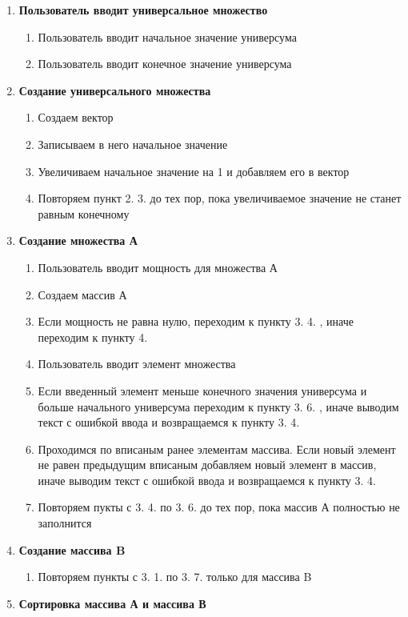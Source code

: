 \documentclass[]{article}
\begin{document}
	\begin{enumerate}[1.]
		\item \textbf{Пользователь вводит универсальное множество} \begin{enumerate}[{1}. 1.]
			 \item Пользователь вводит начальное значение универсума
			 \item Пользователь вводит конечное значение универсума
		\end{enumerate}
		\item \textbf{Создание универсального множества}
		\begin{enumerate}[{2}. 1.] 
		\item Создаем вектор
		\item Записываем в него начальное значение
		\item Увеличиваем начальное значение на 1 и добавляем его в вектор
		\item Повторяем пункт 2. 3. до тех пор, пока увеличиваемое значение не станет равным конечному
		\end{enumerate}
		\item \textbf{Создание множества А}
		\begin{enumerate}[{3}. 1.] 
		\item Пользователь вводит мощность для множества А
		\item Создаем массив А
		\item Если мощность не равна нулю, переходим к пункту 3. 4. , иначе переходим к пункту 4.
		\item Пользователь вводит элемент множества
		\item Если введенный элемент меньше конечного значения универсума и больше начального универсума переходим к пункту 3. 6. , иначе выводим текст с ошибкой ввода и возвращаемся к пункту 3. 4.
		\item Проходимся по вписаным ранее элементам массива. Если новый элемент не равен предыдущим вписаным добавляем новый элемент в массив, иначе выводим текст с ошибкой ввода и возвращаемся к пункту 3. 4.
		\item Повторяем пукты с 3. 4. по 3. 6. до тех пор, пока массив А полностью не заполнится
		\end{enumerate}
		\item \textbf{Создание массива B}
		\begin{enumerate}[{4}. 1.]
		\item Повторяем пункты с 3. 1. по 3. 7. только для массива B
		\end{enumerate}
		\item \textbf{Сортировка массива А и массива В}

\end{enumerate}
\end{document}
